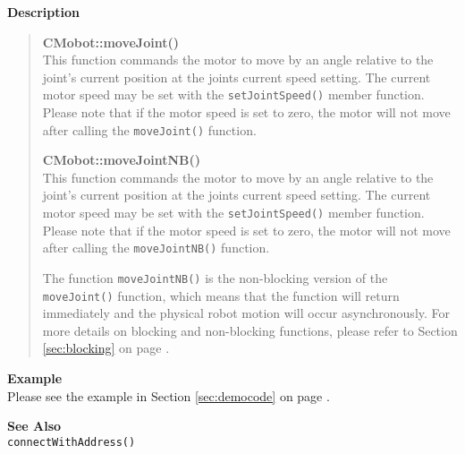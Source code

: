 \noindent
{\bf Description}\\
\vspace{-12pt}
\begin{quote}
{\bf CMobot::moveJoint()}\\
This function commands the motor to move by an angle relative to the
joint's current position at the joints current speed setting.
The current motor speed may be set with the
\texttt{setJointSpeed()} member function. Please note that if the motor speed
is set to zero, the motor will not move after calling the
\texttt{moveJoint()} function. 

{\bf CMobot::moveJointNB()}\\
This function commands the motor to move by an angle relative to the
joint's current position at the joints current speed setting.
The current motor speed may be set with the
\texttt{setJointSpeed()} member function. Please note that if the motor speed
is set to zero, the motor will not move after calling the
\texttt{moveJointNB()} function. 

 The function \texttt{moveJointNB()} is the non-blocking version of
the \texttt{moveJoint()} function, which means that the function will return
immediately and the physical robot motion will occur asynchronously. For
more details on blocking and non-blocking functions, please refer to 
Section \ref{sec:blocking} on page \pageref{sec:blocking}.\\
\end{quote}

\noindent
{\bf Example}\\
Please see the example in Section \ref{sec:democode} on page \pageref{sec:democode}.\\
\noindent

\noindent
{\bf See Also}\\
\texttt{connectWithAddress()}

